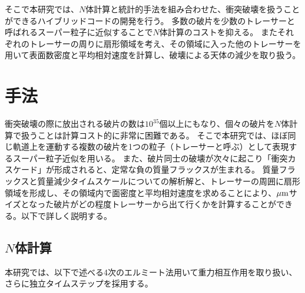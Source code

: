 \documentclass[a4paper,10pt,oneside,twocolumn,notitlepage,final]{jarticle}
\begin{document}
そこで本研究では、$N$体計算と統計的手法を組み合わせた、衝突破壊を扱うことができるハイブリッドコードの開発を行う。
多数の破片を少数のトレーサーと呼ばれるスーパー粒子に近似することで$N$体計算のコストを抑える。
またそれぞれのトレーサーの周りに扇形領域\citep{Morishima2015}を考え、その領域に入った他のトレーサーを用いて表面数密度と平均相対速度を計算し、破壊による天体の減少\citep{Kobayashi2010}を取り扱う。

\section{手法}
衝突破壊の際に放出される破片の数は$10^{35}$個以上にもなり、個々の破片を$N$体計算で扱うことは計算コスト的に非常に困難である。
そこで本研究では、ほぼ同じ軌道上を運動する複数の破片を1つの粒子（トレーサーと呼ぶ）として表現するスーパー粒子近似を用いる。
また、破片同士の破壊が次々に起こり「衝突カスケード」が形成されると、定常な負の質量フラックスが生まれる\citep[e.g.,][]{Tanaka1996}。
質量フラックスと質量減少タイムスケールについての解析解\citep{Kobayashi2010}と、トレーサーの周囲に扇形領域\citep{Morishima2015}を形成し、その領域内で面密度と平均相対速度を求めることにより、$\mu {\rm m}$サイズとなった破片がどの程度トレーサーから出て行くかを計算することができる。以下で詳しく説明する。
\subsection{$N$体計算}
本研究では、以下で述べる4次のエルミート法\citep{Makino1992}用いて重力相互作用を取り扱い、さらに独立タイムステップを採用する。
\end{document}
